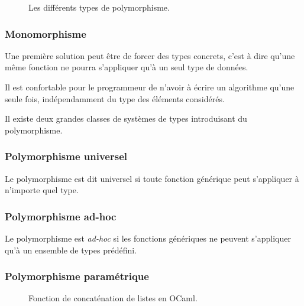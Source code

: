 \begin{figure}
\centering

\caption{Les différents types de polymorphisme.}
\label{fig:types-de-polymorphisme}
\end{figure}

\subsubsection{Monomorphisme}

Une première solution peut être de forcer des types concrets, c'est à dire
qu'une même fonction ne pourra s'appliquer qu'à un seul type de données.

Il est confortable pour le programmeur de n'avoir à écrire un algorithme qu'une
seule fois, indépendamment du type des éléments considérés.

Il existe deux grandes classes de systèmes de types introduisant du
polymorphisme.

\subsubsection{Polymorphisme universel}


Le polymorphisme est dit universel si toute fonction générique peut s'appliquer
à n'importe quel type.

\subsubsection{Polymorphisme ad-hoc}


Le polymorphisme est \emph{ad-hoc} si les fonctions génériques ne peuvent
s'appliquer qu'à un ensemble de types prédéfini.

\subsubsection{Polymorphisme paramétrique}

\cite{Milner78}

\cite{PascalNoEscape}

\begin{figure}
  \caption{Fonction de concaténation de listes en OCaml.}
  \label{fig:listappend}
\end{figure}

